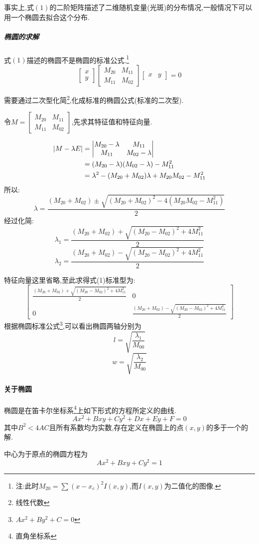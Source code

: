 \documentclass{ctexart}
\begin{document}
事实上,式$(1)$的二阶矩阵描述了二维随机变量(光斑)的分布情况,一般情况下可以用一个椭圆去拟合这个分布.

\subparagraph{椭圆的求解}
式$(1)$描述的椭圆不是椭圆的标准公式.\footnote{注:此时$M_{20}=\sum{(x-x_c)^2I(x,y)}$,而$I(x,y)$为二值化的图像.}
$$
\left[
    \begin{matrix}
        x \\
        y
    \end{matrix}
\right]
\left[
    \begin{matrix}
    M_{20} & M_{11} \\
    M_{11} & M_{02}
    \end{matrix}
\right]
\left[
    \begin{matrix}
        x & y
    \end{matrix}
\right]=0$$

需要通过二次型化简\footnote{线性代数},化成标准的椭圆公式(标准的二次型).

令$M=\left[
    \begin{matrix}
    M_{20} & M_{11} \\
    M_{11} & M_{02}
    \end{matrix}
\right]$,先求其特征值和特征向量.

\begin{align}
|M-\lambda E|&=
\left|
    \begin{matrix}
    M_{20}-\lambda & M_{11} \\
    M_{11} & M_{02}-\lambda
    \end{matrix}
\right| \notag \\
&=(M_{20}-\lambda)(M_{02}-\lambda)-M_{11}^2 \notag\\
&=\lambda^2-(M_{20}+M_{02})\lambda+M_{20}M_{02}-M_{11}^2 \notag
\end{align}
所以:
$$\lambda=\frac{(M_{20}+M_{02})\pm \sqrt{(M_{20}+M_{02})^2-4(M_{20}M_{02}-M_{11}^2)}}{2}$$
经过化简:
$$\lambda_1=\frac{(M_{20}+M_{02})+ \sqrt{(M_{20}-M_{02})^2+4M_{11}^2}}{2}$$
$$\lambda_2=\frac{(M_{20}+M_{02})- \sqrt{(M_{20}-M_{02})^2+4M_{11}^2}}{2}$$


特征向量这里省略,至此求得式(1)标准型为:
$$\left[
    \begin{matrix}
    \frac{(M_{20}+M_{02})+ \sqrt{(M_{20}-M_{02})^2+4M_{11}^2}}{2} & 0 \\
    0 & \frac{(M_{20}+M_{02})- \sqrt{(M_{20}-M_{02})^2+4M_{11}^2}}{2}
    \end{matrix}
\right]$$
根据椭圆标准公式\footnote{$Ax^2+By^2+C=0$},可以看出椭圆两轴分别为
$$l=\sqrt{\frac{\lambda_1}{M_{00}}}$$
$$w=\sqrt{\frac{\lambda_2}{M_{00}}}$$	


\paragraph{关于椭圆}
椭圆是在笛卡尔坐标系\footnote{直角坐标系}上如下形式的方程所定义的曲线.
$$Ax^2+Bxy+Cy^2+Dx+Ey+F=0$$
其中$B^2<4AC$且所有系数均为实数,存在定义在椭圆上的点$(x,y)$的多于一个的解.

中心为于原点的椭圆方程为
$$Ax^2+Bxy+Cy^2=1$$



	
\end{document}
